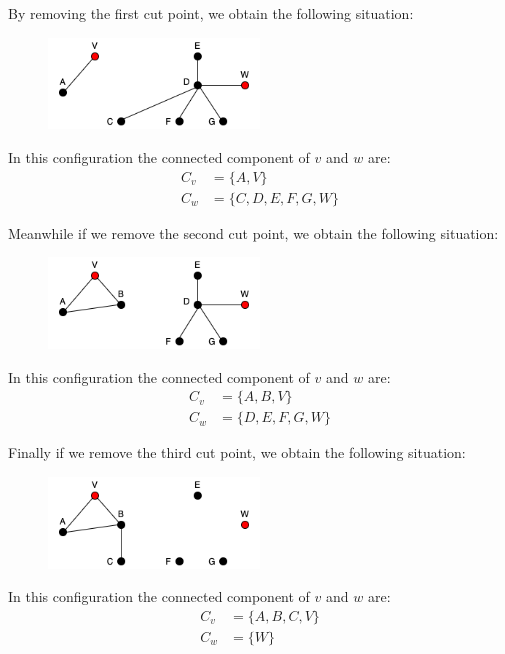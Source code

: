 \documentclass{article}
\begin{document}
    \noindent By removing the first cut point, we obtain the following situation:
    \begin{figure}[H]
        \centering
        \includegraphics[width=0.5\textwidth]{9.4.png}
        \label{fig:figure-6-4}
    \end{figure}
    \noindent In this configuration the connected component of \(v\) and \(w\) are:
    \begin{align*}
        C_{v} &= \{A,V\}\\
        C_{w} &= \{C,D,E,F,G,W\}
    \end{align*}
    
    \noindent Meanwhile if we remove the second cut point, we obtain the following situation:
    \begin{figure}[H]
        \centering
        \includegraphics[width=0.5\textwidth]{9.5.png}
        \label{fig:figure-6-5}
    \end{figure}
    \noindent In this configuration the connected component of \(v\) and \(w\) are:
    \begin{align*}
        C_{v} &= \{A,B,V\}\\
        C_{w} &= \{D,E,F,G,W\}
    \end{align*}
    
    \noindent Finally if we remove the third cut point, we obtain the following situation:
    \begin{figure}[H]
        \centering
        \includegraphics[width=0.5\textwidth]{9.6.png}
        \label{fig:figure-6-6}
    \end{figure}
    \noindent In this configuration the connected component of \(v\) and \(w\) are:
    \begin{align*}
        C_{v} &= \{A,B,C,V\}\\
        C_{w} &= \{W\}
    \end{align*}
    
\end{document}
